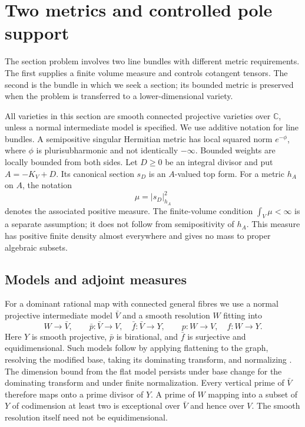\section{Two metrics and controlled pole support}\label{g:analytic}\label{rb:two-metrics}

The section problem involves two line bundles with different metric
requirements.  The first supplies a finite volume measure and controls
cotangent tensors.  The second is the bundle in which we seek a section;
its bounded metric is preserved when the problem is transferred to a
lower-dimensional variety.

All varieties in this section are smooth connected projective varieties
 over $\mathbb C$, unless a normal intermediate model is specified.
We use additive notation for line bundles.  A semipositive singular
Hermitian metric has local squared norm $e^{-\phi}$, where $\phi$ is
plurisubharmonic and not identically $-\infty$.  Bounded weights are
locally bounded from both sides.  Let $D\geq0$ be an integral divisor and
put $A=-K_V+D$.  Its canonical section $s_D$ is an $A$-valued top form.
For a metric $h_A$ on $A$, the notation
\[
                 \mu=|s_D|_{h_A}^{2}
\]
denotes the associated positive measure.  The finite-volume condition
$\int_V\mu<\infty$ is a separate assumption; it does not follow from
semipositivity of $h_A$.  This measure has positive finite density almost
everywhere and gives no mass to proper algebraic subsets.

\subsection{Models and adjoint measures}\label{g:models}

For a dominant rational map with connected general fibres we use a
normal projective intermediate model $\bar V$ and a smooth resolution
$W$ fitting into
\[
 W\longrightarrow\bar V,\qquad
 \bar p:\bar V\longrightarrow V,\quad
 \bar f:\bar V\longrightarrow Y,
 \qquad p:W\longrightarrow V,\quad f:W\longrightarrow Y.
\]
Here $Y$ is smooth projective, $\bar p$ is birational, and $\bar f$ is
surjective and equidimensional.  Such models follow by applying
flattening to the graph, resolving the modified base, taking its
dominating transform, and normalizing \cite{RaynaudGruson1971}.
The dimension bound from the flat model persists under base change for
the dominating transform and under finite normalization.  Every
vertical prime of $\bar V$ therefore maps onto a prime divisor of $Y$.
A prime of $W$ mapping into a subset of $Y$ of codimension at least two
is exceptional over $\bar V$ and hence over $V$.  The smooth resolution
itself need not be equidimensional.

